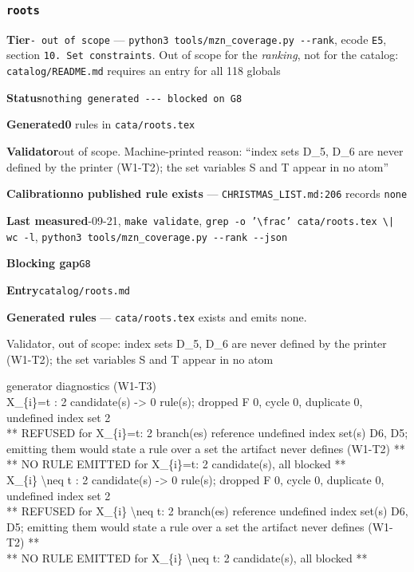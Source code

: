 \documentclass[10pt,a4paper]{article}
\newcommand{\entryfield}[2]{{\raggedright\textbf{#1}\quad #2\par}}
\newcommand{\diag}[1]{{\small\itshape\raggedright #1\par}}
\begin{document}
\subsubsection*{\texttt{roots}}
\label{entry:roots}
\entryfield{Tier}{\texttt{- out of scope} --- \texttt{python3 tools/\allowbreak{}mzn\_\allowbreak{}coverage.\allowbreak{}py -\allowbreak{}-\allowbreak{}rank}, ecode \texttt{E5}, section \texttt{10. Set constraints}. Out of scope for the \emph{ranking}, not for the catalog: \texttt{catalog/README.md} requires an entry for all 118 globals}
\entryfield{Status}{\texttt{nothing generated -\allowbreak{}-\allowbreak{}-\allowbreak{} blocked on G8}}
\entryfield{Generated}{\textbf{0} rules in \texttt{cata/roots.tex}}
\entryfield{Validator}{out of scope. Machine-printed reason: ``index sets D\_5, D\_6 are never defined by the printer (W1-T2); the set variables S and T appear in no atom''}
\entryfield{Calibration}{\textbf{no published rule exists} --- \texttt{CHRISTMAS\_LIST.md:206} records \texttt{none}}
\entryfield{Last measured}{2026-09-21, \texttt{make validate}, \texttt{grep -\allowbreak{}o '\textbackslash{}frac' cata/\allowbreak{}roots.\allowbreak{}tex \textbackslash{}| wc -\allowbreak{}l}, \texttt{python3 tools/\allowbreak{}mzn\_\allowbreak{}coverage.\allowbreak{}py -\allowbreak{}-\allowbreak{}rank -\allowbreak{}-\allowbreak{}json}}
\entryfield{Blocking gap}{\texttt{G8}}
\entryfield{Entry}{\texttt{catalog/roots.md}}

\textbf{Generated rules} --- \texttt{cata/roots.tex} exists and emits none.

\diag{Validator, out of scope: index sets D\_5, D\_6 are never defined by the printer (W1-T2); the set variables S and T appear in no atom}

\diag{generator diagnostics (W1-T3)\\{} X\_\{i\}=t : 2 candidate(s) -> 0 rule(s); dropped F 0, cycle 0, duplicate 0, undefined index set 2\\{}   ** REFUSED for X\_\{i\}=t: 2 branch(es) reference undefined index set(s) D6, D5; emitting them would state a rule over a set the artifact never defines (W1-T2) **\\{}   ** NO RULE EMITTED for X\_\{i\}=t: 2 candidate(s), all blocked **\\{} X\_\{i\} \textbackslash{}neq t : 2 candidate(s) -> 0 rule(s); dropped F 0, cycle 0, duplicate 0, undefined index set 2\\{}   ** REFUSED for X\_\{i\} \textbackslash{}neq t: 2 branch(es) reference undefined index set(s) D6, D5; emitting them would state a rule over a set the artifact never defines (W1-T2) **\\{}   ** NO RULE EMITTED for X\_\{i\} \textbackslash{}neq t: 2 candidate(s), all blocked **}
\end{document}

